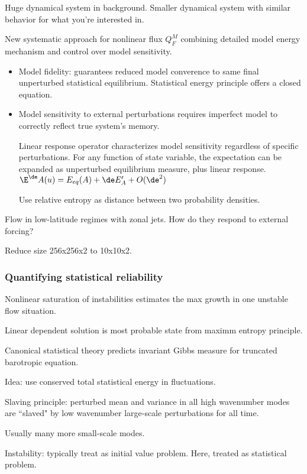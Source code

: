 Huge dynamical system in background. Smaller dynamical system with similar behavior for what you're interested in.

New systematic approach for nonlinear flux $Q_F^M$ combining detailed model energy mechanism and control over model sensitivity.

\begin{itemize}
\item
Model fidelity: guarantees reduced model converence to same final unperturbed statistical equilibrium.
Statistical energy principle offers a closed equation.
\item
Model sensitivity to external perturbations requires imperfect model to correctly reflect true system's memory.

Linear response operator characterizes model sensitivity regardless of specific perturbations.
For any function of state variable, the  expectation can be expanded as unperturbed equilibrium measure, plus linear response.
$\E^\de A(u) = E_{eq}(A)+\de E_A' + O(\de^2)$

Use relative entropy as distance between two probability densities.
\end{itemize}

Flow in low-latitude regimes with zonal jets. How do they respond to external forcing?

Reduce size 256x256x2 to 10x10x2.


\subsubsection{Quantifying statistical reliability}

Nonlinear saturation of instabilities estimates the max growth in one unstable flow situation. %

Linear dependent solution is most probable state from maximm entropy principle.

Canonical statistical theory predicts invariant Gibbs measure for truncated barotropic equation.

Idea: use conserved total statistical energy in fluctuations.

Slaving principle: perturbed mean and variance in all high wavenumber modes are ``slaved" by low wavenumber large-scale perturbations for all time. 

Usually many more small-scale modes.


Instability: typically treat as initial value problem. Here, treated as statistical problem.


